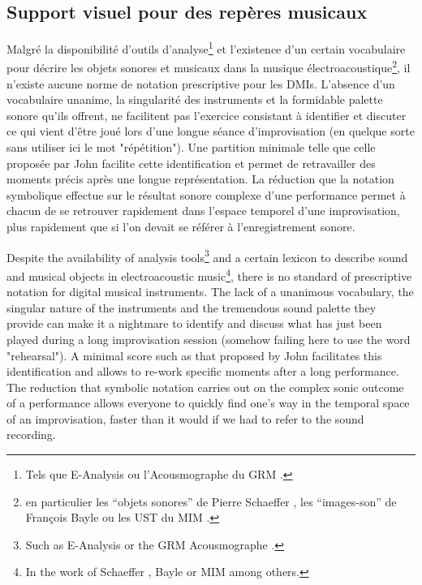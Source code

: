 \subsection{Support visuel pour des repères musicaux}

\noindent Malgré la disponibilité d'outils d'analyse\footnote{Tels que E-Analysis \cite{couprie_eanalysis:_2016} ou l'Acousmographe du \gls{GRM} \cite{favreau_lacousmographe_2010}.} et l'existence d'un certain vocabulaire pour décrire les objets sonores et musicaux dans la musique électroacoustique\footnote{en particulier les ``objets sonores'' de Pierre Schaeffer \cite{schaeffer_traite_1966}, les ``images-son'' de François Bayle \cite{bayle_musique_1993} ou les \gls{UST} du \gls{MIM} \cite{delalande_les_1996}.}, il n'existe aucune norme de notation prescriptive pour les \glspl{DMI}. L'absence d'un vocabulaire unanime, la singularité des instruments et la formidable palette sonore qu'ils offrent, ne facilitent pas l'exercice consistant à identifier et discuter ce qui vient d'être joué lors d'une longue séance d'improvisation (en quelque sorte sans utiliser ici le mot "répétition"). Une partition minimale telle que celle proposée par John facilite cette identification et permet de retravailler des moments précis après une longue représentation. La réduction que la notation symbolique effectue sur le résultat sonore complexe d'une performance permet à chacun de se retrouver rapidement dans l'espace temporel d'une improvisation, plus rapidement que si l'on devait se référer à l'enregistrement sonore.


Despite the availability of analysis tools\footnote{Such as E-Analysis \cite{couprie_eanalysis:_2016} or the GRM Acousmographe \cite{favreau_lacousmographe_2010}.} and a certain lexicon to describe sound and musical objects in electroacoustic music\footnote{In the work of Schaeffer \cite{schaeffer_traite_1966}, Bayle \cite{bayle_musique_1993} or MIM \cite{delalande_les_1996} among others.}, there is no standard of prescriptive notation for digital musical instruments. The lack of a unanimous vocabulary, the singular nature of the instruments and the tremendous sound palette they provide can make it a nightmare to identify and discuss what has just been played during a long improvisation session (somehow failing here to use the word "rehearsal"). A minimal score such as that proposed by John facilitates this identification and allows to re-work specific moments after a long performance. The reduction that symbolic notation carries out on the complex sonic outcome of a performance allows everyone to quickly find one's way in the temporal space of an improvisation, faster than it would if we had to refer to the sound recording.

